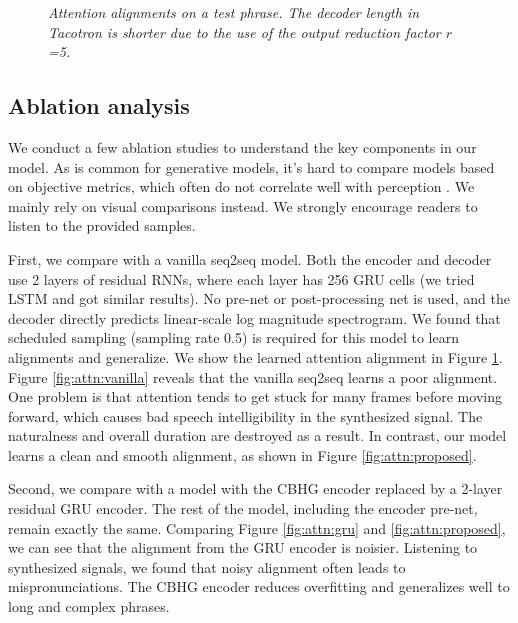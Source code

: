 \documentclass{article} \usepackage{iclr2017_conference,times}
\begin{document}
\begin{figure}[t]
\centering
{}
\caption{{\it Attention alignments on a test phrase. The decoder length in Tacotron is shorter due to the use of the output reduction factor $r$=5. }}
\label{fig:attn}
\end{figure}


\subsection{Ablation analysis}
We conduct a few ablation studies to understand the key components in our model. As is common for generative models, it's hard to compare models based on objective metrics, which often do not correlate well with perception \citep{theis2015note}. We mainly rely on visual comparisons instead. We strongly encourage readers to listen to the provided samples.

First, we compare with a vanilla seq2seq model. Both the encoder and decoder use 2 layers of residual RNNs, where each layer has 256 GRU cells (we tried LSTM and got similar results). No pre-net or post-processing net is used, and the decoder directly predicts linear-scale log magnitude spectrogram. We found that scheduled sampling (sampling rate 0.5) is required for this model to learn alignments and generalize. We show the learned attention alignment in Figure \ref{fig:attn}. Figure \ref{fig:attn:vanilla} reveals that the vanilla seq2seq learns a poor alignment. One problem is that attention tends to get stuck for many frames before moving forward, which causes bad speech intelligibility in the synthesized signal. The naturalness and overall duration are destroyed as a result. In contrast, our model learns a clean and smooth alignment, as shown in Figure \ref{fig:attn:proposed}.

Second, we compare with a model with the CBHG encoder replaced by a 2-layer residual GRU encoder. The rest of the model, including the encoder pre-net, remain exactly the same. Comparing Figure \ref{fig:attn:gru} and \ref{fig:attn:proposed}, we can see that the alignment from the GRU encoder is noisier. Listening to synthesized signals, we found that noisy alignment often leads to mispronunciations. The CBHG encoder reduces overfitting and generalizes well to long and complex phrases.
\end{document}
